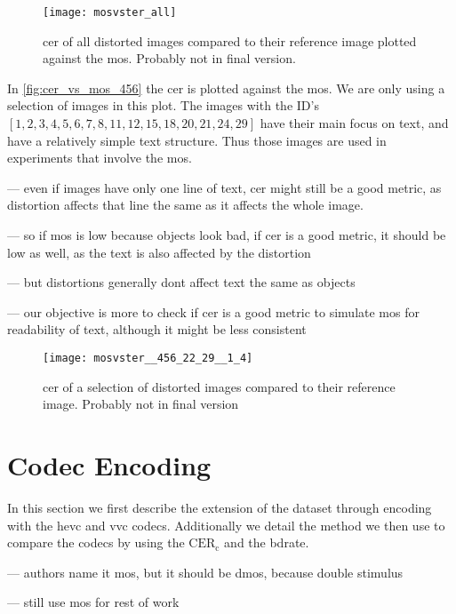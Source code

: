 \begin{figure}[h!]
    \centering
    \texttt{[image: mosvster\_all]}
    \caption{\gls{cer} of all distorted images compared to their reference image plotted against the \gls{mos}. Probably not in final version.}
    \label{fig:cer_vs_mos}
\end{figure}

In \autoref{fig:cer_vs_mos_456} the \gls{cer} is plotted against the \gls{mos}.
We are only using a selection of images in this plot.
The images with the ID's $[1, 2, 3, 4, 5, 6, 7, 8, 11, 12, 15, 18, 20, 21, 24, 29]$ have their main focus on text, and have a relatively simple text structure.
Thus those images are used in experiments that involve the \gls{mos}.

--- even if images have only one line of text, cer might still be a good metric, as distortion affects that line the same as it affects the whole image.

--- so if mos is low because objects look bad, if cer is a good metric, it should be low as well, as the text is also affected by the distortion

--- but distortions generally dont affect text the same as objects

--- our objective is more to check if cer is a good metric to simulate mos for readability of text, although it might be less consistent


\begin{figure}[h!]
    \centering
    \texttt{[image: mosvster\_\_456\_22\_29\_\_1\_4]}
    \caption{\gls{cer} of a selection of distorted images compared to their reference image. Probably not in final version}
    \label{fig:cer_vs_mos_456}
\end{figure}

\section{Codec Encoding}
\label{sec:dataset_codec}

In this section we first describe the extension of the dataset through encoding with the \gls{hevc} and \gls{vvc} codecs.
Additionally we detail the method we then use to compare the codecs by using the $\text{CER}_{\text{c}}$ and the \gls{bdrate}.

--- authors name it mos, but it should be dmos, because double stimulus \cite{mos_dmos_1993}

--- still use mos for rest of work

